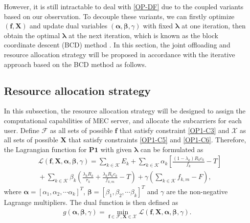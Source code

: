 \documentclass[journal]{IEEEtran}
\begin{document}
    However, it is still intractable to deal with \eqref{OP-DF} due to the coupled variants based on our observation. To decouple these variants, we can firstly optimize $(\boldsymbol{f}, \boldsymbol{X})$ and update dual variables $(\boldsymbol\alpha,\boldsymbol\beta,\gamma)$ with fixed $\boldsymbol{\lambda}$ at one iteration, then obtain the optimal $\boldsymbol\lambda$ at the next iteration, which is known as the block coordinate descent (BCD) method \cite{Richt2014Iteration}. In this section, the joint offloading and resource allocation strategy will be proposed in accordance with the iterative approach based on the BCD method as follows.
    \subsection{Resource allocation strategy}\label{3A}
    In this subsection, the resource allocation strategy will be designed to assign the computational capabilities of MEC server, and allocate the subcarriers for each user. Define $\mathcal{F}$ as all sets of possible $\boldsymbol{f}$ that satisfy constraint \eqref{OP1-C3} and $\mathcal{X}$ as all sets of possible $\boldsymbol{X}$ that satisfy constraints \eqref{OP1-C5} and \eqref{OP1-C6}. Therefore, the Lagrangian function for $\mathbf{P1}$ with given $\boldsymbol\lambda$ can be formulated as
    \begin{equation}
        \label{OP-L}
        \begin{aligned}
            &\!\mathcal{L}(\boldsymbol{f},\boldsymbol{X},\boldsymbol\alpha,\boldsymbol\beta,\gamma)\!=\!\!\sum_{k\in\mathcal{K}} \!E_k\!+\!\!\sum_{k\in\mathcal{K}}\alpha_{k}\!\left[\frac{(1\!-\!\lambda_{k})R_{k}c_{k}}{f_{k}}\!-\!T\right]\\
            &\!\!+\!\sum_{k\in\mathcal{K}}\!\beta_{k}\!\left(\frac{\lambda_{k}R_{k}}{r_{k}}\!+\!\frac{\lambda_{k}R_{k}c_{k}}{f_{k,m}}\!-\!T\right)\!\!+\!\gamma\!\left(\sum_{k\in\mathcal{K}}f_{k,m}\!-\!F\right)\!,
        \end{aligned}
    \end{equation}
    where $\boldsymbol\alpha = \left[\alpha_{1},\alpha_{2},\cdots\alpha_{k}\right]^T$, $\boldsymbol\beta = \left[\beta_{1},\beta_{2},\cdots\beta_{k}\right]^T$ and $\gamma$ are the non-negative Lagrange multipliers. The dual function is then defined as
    \begin{equation}
        \label{OP-DF}
        \begin{aligned}
            g(\boldsymbol\alpha,\boldsymbol \beta,\gamma) = \min_{\boldsymbol{f}\in\mathcal{F},\boldsymbol{X}\in \mathcal{X}}\mathcal{L}(\boldsymbol{f},\boldsymbol{X},\boldsymbol\alpha,\boldsymbol\beta,\gamma).
        \end{aligned}
    \end{equation}
\end{document}
